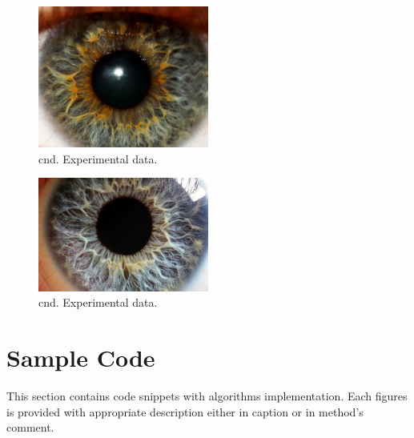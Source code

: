 \documentclass{article}
\begin{document}
\begin{figure}[H]
\centering
\includegraphics[width=0.5\textwidth]{_Figures/raw_data_3.jpg}\hfill
\caption{cnd. Experimental data.}
\label{fig:experimental_data_2}
\end{figure}

\begin{figure}[H]
\centering
\includegraphics[width=0.5\textwidth]{_Figures/raw_data_4.jpg}\hfill
\caption{cnd. Experimental data.}
\label{fig:experimental_data_3}
\end{figure}




\newpage
\section{Sample Code}
This section contains code snippets with algorithms implementation. Each figures is provided with appropriate description either in caption or in method's comment. 


%
%
\end{document}
